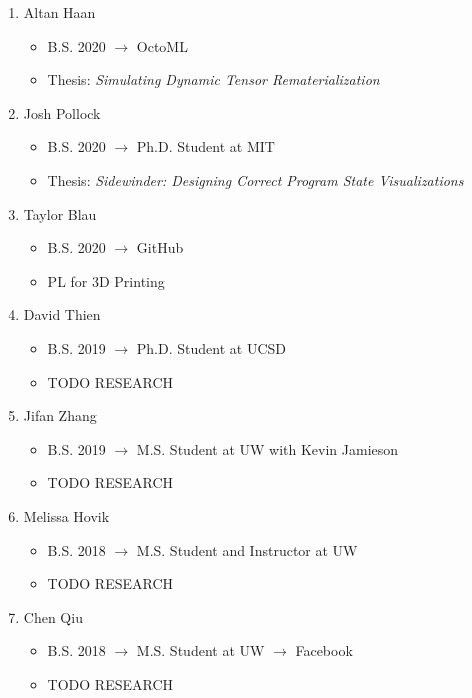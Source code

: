 \documentclass[10pt]{article}
\begin{document}
\begin{enumerate}[resume]
  \item Altan Haan
    \begin{itemize}
      \item B.S. 2020 $\rightarrow$ OctoML
      \item Thesis: \textit{Simulating Dynamic Tensor Rematerialization}
    \end{itemize}

  \item Josh Pollock
    \begin{itemize}
      \item B.S. 2020 $\rightarrow$ Ph.D. Student at MIT
      \item Thesis: \textit{Sidewinder: Designing Correct Program State Visualizations}
    \end{itemize}

  \item Taylor Blau
    \begin{itemize}
      \item B.S. 2020 $\rightarrow$ GitHub
      \item PL for 3D Printing
    \end{itemize}

  \item David Thien
    \begin{itemize}
      \item B.S. 2019 $\rightarrow$ Ph.D. Student at UCSD
      \item TODO RESEARCH
    \end{itemize}

  \item Jifan Zhang
    \begin{itemize}
      \item B.S. 2019 $\rightarrow$ M.S. Student at UW with Kevin Jamieson
      \item TODO RESEARCH
    \end{itemize}

  \item Melissa Hovik
    \begin{itemize}
      \item B.S. 2018 $\rightarrow$ M.S. Student and Instructor at UW
      \item TODO RESEARCH
    \end{itemize}

  \item Chen Qiu
    \begin{itemize}
      \item B.S. 2018 $\rightarrow$ M.S. Student at UW
                      $\rightarrow$ Facebook
      \item TODO RESEARCH
    \end{itemize}


\end{enumerate}
\end{document}
